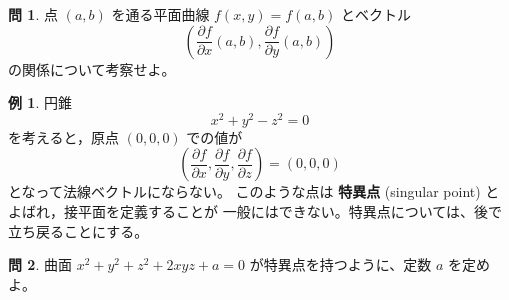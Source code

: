 \documentclass[a4paper]{jsarticle}
\theoremstyle{definition}
\newtheorem{Example}[Theorem]{例}
\newtheorem{Exercise}{問}%
\theoremstyle{remark}
\newcommand{\del}{\partial}
\begin{document}
\begin{Exercise}
点 $(a,b)$ を通る平面曲線 $f(x,y) = f(a,b)$ とベクトル
\[
\left( \frac{\del f}{\del x}(a,b), \frac{\del f}{\del y}(a,b) \right)
\]
の関係について考察せよ。 
\end{Exercise} 

\begin{Example}
円錐
\[
x^2 + y^2 - z^2 = 0
\]
を考えると，原点 $(0,0,0)$ での値が
\[
\left(
\frac{\del f}{\del x}, \frac{\del f}{\del y}, \frac{\del f}{\del z}
\right) = (0,0,0)
\]
となって法線ベクトルにならない。
このような点は {\bf 特異点} (singular point) とよばれ，接平面を定義することが
一般にはできない。特異点については、後で立ち戻ることにする。
\end{Example}

\begin{Exercise}
曲面 $x^2+y^2+z^2 + 2xyz + a = 0$ が特異点を持つように、定数 $a$ を定めよ。
\end{Exercise} 




\end{document}
